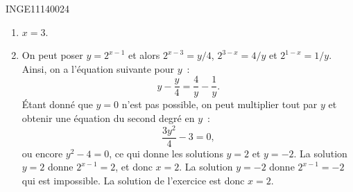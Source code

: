 \documentclass{article}
\begin{document}


\begin{corrige}{INGE11140024}

	\begin{enumerate}

		\item
			$x=3$.
		\item
			On peut poser $y=2^{x-1}$ et alors $2^{x-3}=y/4$, $2^{3-x}=4/y$ et $2^{1-x}=1/y$. Ainsi, on a l'équation suivante pour $y$~:
			\begin{equation}
				y-\frac{ y }{ 4 }=\frac{ 4 }{ y }-\frac{1}{ y }.
			\end{equation}
			Étant donné que $y=0$ n'est pas possible, on peut multiplier tout par $y$ et obtenir une équation du second degré en $y$~:
			\begin{equation}
				\frac{ 3y^2 }{ 4 }-3=0,
			\end{equation}
			ou encore $y^2-4=0$, ce qui donne les solutions $y=2$ et $y=-2$. La solution $y=2$ donne $2^{x-1}=2$, et donc $x=2$. La solution $y=-2$ donne $2^{x-1}=-2$ qui est impossible.  La solution de l'exercice est donc $x=2$.
				

\end{enumerate}
\end{corrige}
\end{document}
